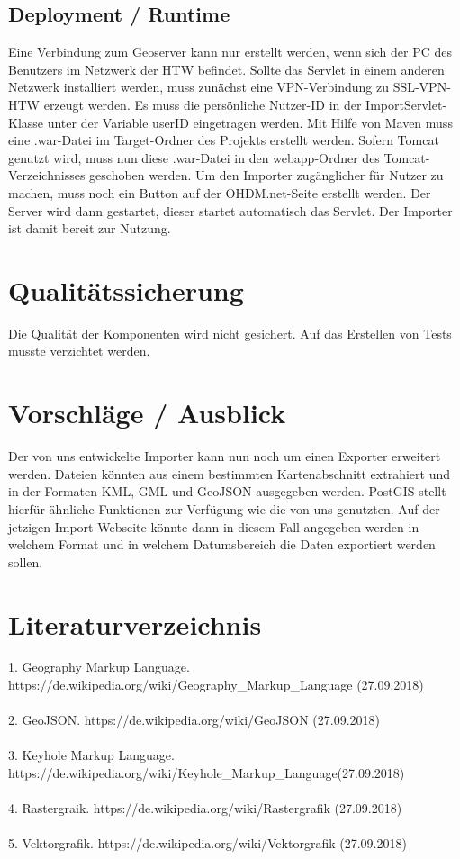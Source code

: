 \documentclass[]{article}
\begin{document}
\subsection{Deployment / Runtime}
Eine Verbindung zum Geoserver kann nur erstellt werden, wenn sich der PC des Benutzers im Netzwerk der HTW befindet. Sollte das Servlet in einem anderen Netzwerk installiert werden, muss zunächst eine VPN-Verbindung zu SSL-VPN-HTW erzeugt werden. 
Es muss die persönliche Nutzer-ID in der ImportServlet-Klasse unter der Variable userID eingetragen werden.
Mit Hilfe von Maven muss eine .war-Datei im Target-Ordner des Projekts erstellt werden. Sofern Tomcat genutzt wird, muss nun diese .war-Datei in den webapp-Ordner des Tomcat-Verzeichnisses geschoben werden. Um den Importer zugänglicher für Nutzer zu machen, muss noch ein Button auf der OHDM.net-Seite erstellt werden. Der Server wird dann gestartet, dieser startet automatisch das Servlet. Der Importer ist damit bereit zur Nutzung.

\section{Qualitätssicherung}
Die Qualität der Komponenten wird nicht gesichert. Auf das Erstellen von Tests musste verzichtet werden.


\section{Vorschläge / Ausblick}
Der von uns entwickelte Importer kann nun noch um einen Exporter erweitert werden. Dateien könnten aus einem bestimmten Kartenabschnitt extrahiert und in der Formaten KML, GML und GeoJSON ausgegeben werden. PostGIS stellt hierfür ähnliche Funktionen zur Verfügung wie die von uns genutzten. Auf der jetzigen Import-Webseite könnte dann in diesem Fall angegeben werden in welchem Format und in welchem Datumsbereich die Daten exportiert werden sollen.

\newpage
\section{Literaturverzeichnis}

1. Geography Markup Language. https://de.wikipedia.org/wiki/Geography\_Markup\_Language (27.09.2018)\\
\\

2. GeoJSON. https://de.wikipedia.org/wiki/GeoJSON (27.09.2018)\\
\\

3. Keyhole Markup Language. https://de.wikipedia.org/wiki/Keyhole\_Markup\_Language(27.09.2018)\\
\\

4. Rastergraik. https://de.wikipedia.org/wiki/Rastergrafik (27.09.2018)\\
\\

5. Vektorgrafik. https://de.wikipedia.org/wiki/Vektorgrafik (27.09.2018)
\end{document}
